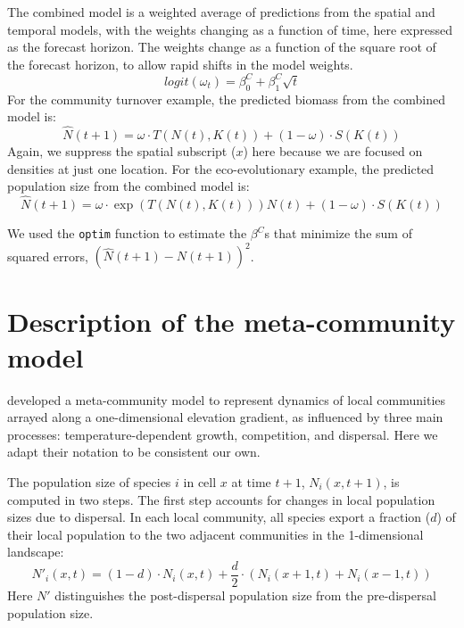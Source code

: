 \documentclass[11pt]{article}
\begin{document}
The combined model is a weighted average of predictions from the spatial and temporal models, with the weights changing as a function of time, here expressed as the forecast horizon. The weights change as a function of the square root of the forecast horizon, to allow rapid shifts in the model weights. 
\begin{equation}
logit(\omega_t)=\beta^C_0 + \beta^C_1 \sqrt{t}
\label{eqn:weights}
\end{equation}
For the community turnover example, the predicted biomass from the combined model is:
\begin{equation}
\hat{N}(t+1)= \omega \cdot T(N(t),K(t)) + (1-\omega) \cdot S(K(t)) 
\label{eqn:combined_model1}
\end{equation}
Again, we suppress the spatial subscript ($x$) here because we are focused on densities at just one location. For the eco-evolutionary example, the predicted population size from the combined model is:
\begin{equation}
\hat{N}(t+1) = \omega \cdot \exp(T(N(t),K(t))) N(t) + (1-\omega) \cdot S(K(t)) 
\label{eqn:combined_model2}
\end{equation}

We used the \texttt{optim} function to estimate the $\beta^C$s that minimize the sum of squared errors, $(\hat{N}(t+1) - N(t+1))^2$.

\section{Description of the meta-community model}\label{metacomm}

\cite{alexander_lags_2018} developed a meta-community model to represent dynamics of local communities arrayed along a one-dimensional elevation gradient, as influenced by three main processes: temperature-dependent growth, competition, and dispersal. Here we adapt their notation to be consistent our own.

The population size of species $i$ in cell $x$ at time $t + 1$, $N_{i}(x,t+1)$, is computed in two steps. The first step accounts for changes in local population sizes due to dispersal. In each local community, all species export a fraction ($d$) of their local population to the two adjacent communities in the 1-dimensional landscape:
\begin{equation}
N'_{i}(x,t) = (1-d) \cdot N_{i}(x,t) + \frac{d}{2} \cdot (N_{i}(x+1,t) + N_{i}(x-1,t))
\end{equation}
Here $N'$ distinguishes the post-dispersal population size from the pre-dispersal population size.
\end{document}
